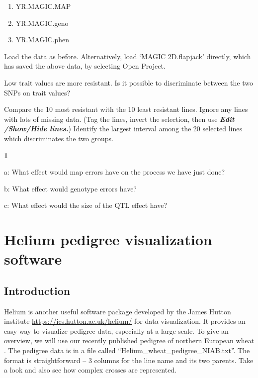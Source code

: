\documentclass[
]{book}
\makeatletter
\providecommand{\tightlist}{%
  \setlength{\itemsep}{0pt}\setlength{\parskip}{0pt}}
\newenvironment{kframe}{%
\medskip{}
\setlength{\fboxsep}{.8em}
 \def\at@end@of@kframe{}%
 \ifinner\ifhmode%
  \def\at@end@of@kframe{\end{minipage}}%
  \begin{minipage}{\columnwidth}%
 \fi\fi%
 \def\FrameCommand##1{\hskip\@totalleftmargin \hskip-\fboxsep
 \colorbox{shadecolor}{##1}\hskip-\fboxsep
     \hskip-\linewidth \hskip-\@totalleftmargin \hskip\columnwidth}%
 \MakeFramed {\advance\hsize-\width
   \@totalleftmargin\z@ \linewidth\hsize
   \@setminipage}}%
 {\par\unskip\endMakeFramed%
 \at@end@of@kframe}
\newenvironment{rmdblock}[1]
  {
  \begin{itemize}
  \renewcommand{\labelitemi}{
    \raisebox{-.7\height}[0pt][0pt]{
      {\setkeys{Gin}{width=3em,keepaspectratio}\texttt{[image: images/\#1]}}
    }
  }
  \setlength{\fboxsep}{1em}
  \begin{kframe}
  \item
  }
  {
  \end{kframe}
  \end{itemize}
  }
\newenvironment{rmdquiz}
  {\begin{rmdblock}{quiz}}
  {\end{rmdblock}}
\makeatother
\begin{document}
\begin{enumerate}
\def\labelenumi{\arabic{enumi}.}
\tightlist
\item
  YR.MAGIC.MAP
\item
  YR.MAGIC.geno
\item
  YR.MAGIC.phen
\end{enumerate}

Load the data as before. Alternatively, load `MAGIC 2D.flapjack' directly, which has saved the above data, by selecting Open Project.

Low trait values are more resistant. Is it possible to discriminate between the two SNPs on trait values?

Compare the 10 most resistant with the 10 least resistant lines. Ignore any lines with lots of missing data. (Tag the lines, invert the selection, then use \textbf{\emph{Edit /Show/Hide lines.}}) Identify the largest interval among the 20 selected lines which discriminates the two groups.

\begin{rmdquiz}
\textbf{1}

a: What effect would map errors have on the process we have just done?

b: What effect would genotype errors have?

c: What effect would the size of the QTL effect have?
\end{rmdquiz}

\hypertarget{helium-pedigree-visualization-software}{%
\section{Helium pedigree visualization software}\label{helium-pedigree-visualization-software}}

\hypertarget{introduction-3}{%
\subsection{Introduction}\label{introduction-3}}

Helium is another useful software package developed by the James Hutton institute \url{https://ics.hutton.ac.uk/helium/} for data visualization. It provides an easy way to visualize pedigree data, especially at a large scale. To give an overview, we will use our recently published pedigree of northern European wheat \citep{Fradgley2019}. The pedigree data is in a file called ``Helium\_wheat\_pedigree\_NIAB.txt''. The format is straightforward -- 3 columns for the line name and its two parents. Take a look and also see how complex crosses are represented.
\end{document}
